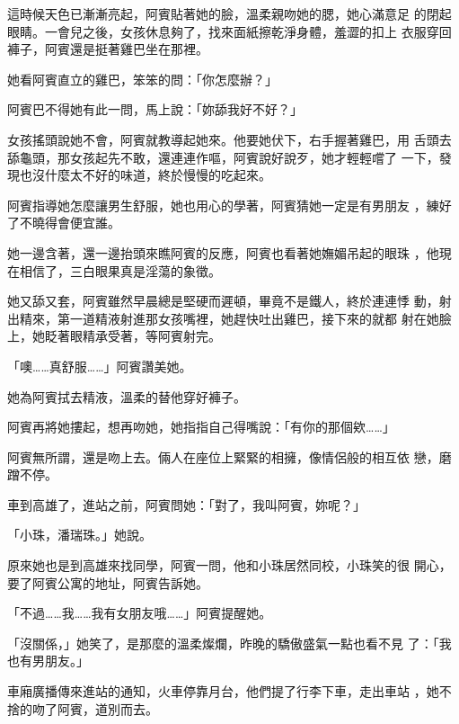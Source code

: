 這時候天色已漸漸亮起，阿賓貼著她的臉，溫柔親吻她的腮，她心滿意足
的閉起眼睛。一會兒之後，女孩休息夠了，找來面紙擦乾淨身體，羞澀的扣上
衣服穿回褲子，阿賓還是挺著雞巴坐在那裡。

她看阿賓直立的雞巴，笨笨的問：「你怎麼辦？」

阿賓巴不得她有此一問，馬上說：「妳舔我好不好？」

女孩搖頭說她不會，阿賓就教導起她來。他要她伏下，右手握著雞巴，用
舌頭去舔龜頭，那女孩起先不敢，還連連作嘔，阿賓說好說歹，她才輕輕嚐了
一下，發現也沒什麼太不好的味道，終於慢慢的吃起來。

阿賓指導她怎麼讓男生舒服，她也用心的學著，阿賓猜她一定是有男朋友
，練好了不曉得會便宜誰。

她一邊含著，還一邊抬頭來瞧阿賓的反應，阿賓也看著她嫵媚吊起的眼珠
，他現在相信了，三白眼果真是淫蕩的象徵。

她又舔又套，阿賓雖然早晨總是堅硬而遲頓，畢竟不是鐵人，終於連連悸
動，射出精來，第一道精液射進那女孩嘴裡，她趕快吐出雞巴，接下來的就都
射在她臉上，她眨著眼精承受著，等阿賓射完。

「噢……真舒服……」阿賓讚美她。

她為阿賓拭去精液，溫柔的替他穿好褲子。

阿賓再將她摟起，想再吻她，她指指自己得嘴說：「有你的那個欸……」

阿賓無所謂，還是吻上去。倆人在座位上緊緊的相擁，像情侶般的相互依
戀，磨蹭不停。

車到高雄了，進站之前，阿賓問她：「對了，我叫阿賓，妳呢？」

「小珠，潘瑞珠。」她說。

原來她也是到高雄來找同學，阿賓一問，他和小珠居然同校，小珠笑的很
開心，要了阿賓公寓的地址，阿賓告訴她。

「不過……我……我有女朋友哦……」阿賓提醒她。

「沒關係，」她笑了，是那麼的溫柔燦爛，昨晚的驕傲盛氣一點也看不見
了：「我也有男朋友。」

車廂廣播傳來進站的通知，火車停靠月台，他們提了行李下車，走出車站
，她不捨的吻了阿賓，道別而去。










